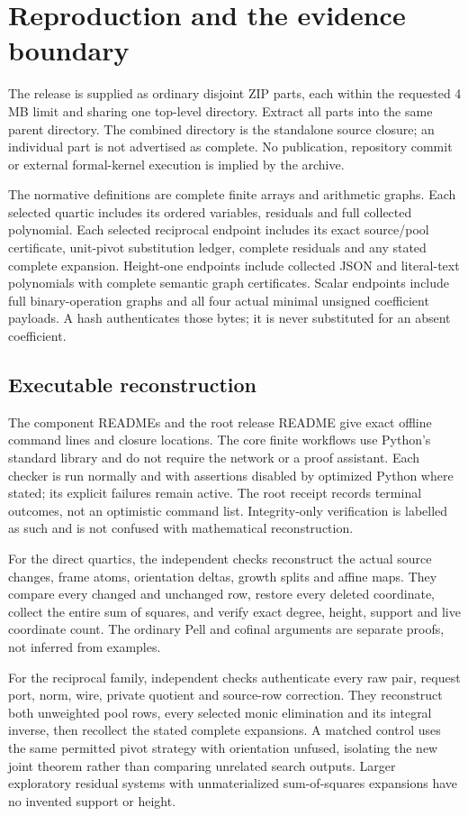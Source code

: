 \section{Reproduction and the evidence boundary}
\label{sec:verification}
The release is supplied as ordinary disjoint ZIP parts, each within the
requested 4 MB limit and sharing one top-level directory. Extract all parts
into the same parent directory. The combined directory is the standalone
source closure; an individual part is not advertised as complete.
No publication, repository commit or external formal-kernel execution is
implied by the archive.

The normative definitions are complete finite arrays and arithmetic graphs.
Each selected quartic includes its ordered variables, residuals and full
collected polynomial. Each selected reciprocal endpoint includes its exact
source/pool certificate, unit-pivot substitution ledger, complete residuals
and any stated complete expansion. Height-one endpoints include collected
JSON and literal-text polynomials with complete semantic graph certificates.
Scalar endpoints include full binary-operation graphs and all four actual
minimal unsigned coefficient payloads. A hash authenticates those bytes;
it is never substituted for an absent coefficient.

\subsection{Executable reconstruction}
The component READMEs and the root release README give exact offline command
lines and closure locations. The core finite workflows use Python's standard
library and do not require the network or a proof assistant. Each checker is
run normally and with assertions disabled by optimized Python where stated;
its explicit failures remain active. The root receipt records terminal
outcomes, not an optimistic command list. Integrity-only verification is
labelled as such and is not confused with mathematical reconstruction.

For the direct quartics, the independent checks reconstruct the actual
source changes, frame atoms, orientation deltas, growth splits and affine
maps. They compare every changed and unchanged row, restore every deleted
coordinate, collect the entire sum of squares, and verify exact degree,
height, support and live coordinate count. The ordinary Pell and cofinal
arguments are separate proofs, not inferred from examples.

For the reciprocal family, independent checks authenticate every raw pair,
request port, norm, wire, private quotient and source-row correction. They
reconstruct both unweighted pool rows, every selected monic elimination and
its integral inverse, then recollect the stated complete expansions. A
matched control uses the same permitted pivot strategy with orientation
unfused, isolating the new joint theorem rather than comparing unrelated
search outputs. Larger exploratory residual systems with unmaterialized
sum-of-squares expansions have no invented support or height.


